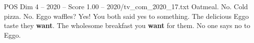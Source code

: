 \begin{textsample}{POS Dim 4 – 2020 – Score 1.00 – 2020/tv\_com\_2020\_17.txt}  \label{ex:f4_pos_050}
Oatmeal.
No.
Cold pizza.
No.
Eggo waffles?
Yes!
You both said yes to something.
The delicious Eggo taste they \textbf{want}.
The wholesome breakfast you \textbf{want} for them.
No one says no to Eggo.

\end{textsample}

